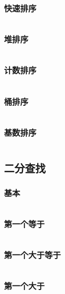 \documentclass[a4paper,11pt]{article}
\begin{document}
\subsubsection{快速排序} 
\inputminted[linenos,autogobble]{java}{basic/sort/quick.java}

\subsubsection{堆排序} 
\inputminted[linenos,autogobble]{java}{basic/sort/heap.java}

\subsubsection{计数排序} 
\inputminted[linenos,autogobble]{java}{basic/sort/count.java}

\subsubsection{桶排序} 
\inputminted[linenos,autogobble]{java}{basic/sort/bucket.java}

\subsubsection{基数排序} 
\inputminted[linenos,autogobble]{java}{basic/sort/redix.java}

\newpage
\subsection{二分查找}

\subsubsection{基本}
\inputminted[linenos,autogobble]{java}{basic/binary-search/basis.java}

\subsubsection{第一个等于}
\inputminted[linenos,autogobble]{java}{basic/binary-search/first-eq.java}

\subsubsection{第一个大于等于}
\inputminted[linenos,autogobble]{java}{basic/binary-search/first-geq.java}

\subsubsection{第一个大于}
\inputminted[linenos,autogobble]{java}{basic/binary-search/first-g.java}
\end{document}

